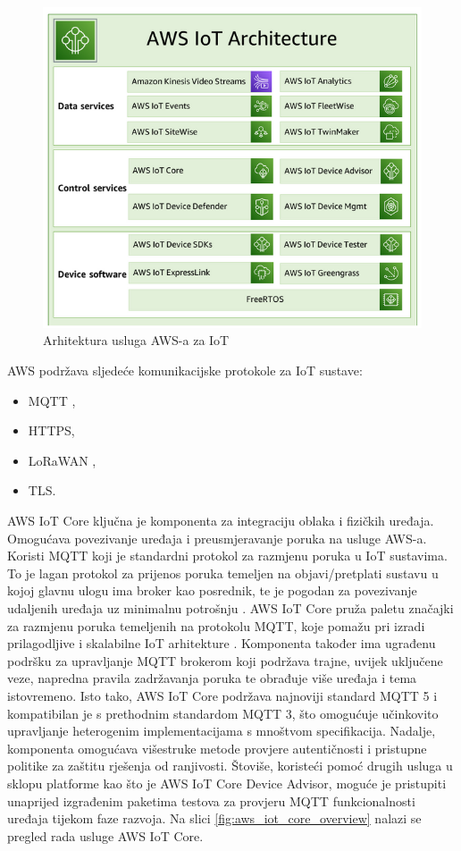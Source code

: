 \begin{figure}[ht]
	\centering
	\includegraphics[scale=0.8]{imgs/aws_iot_arch}
	\caption{Arhitektura usluga AWS-a za IoT \cite{aws_docs}}
	\label{fig:aws_iot_arch}
\end{figure}

AWS podržava sljedeće komunikacijske protokole za IoT sustave:
\begin{itemize}
	\item MQTT ,
	\item HTTPS,
	\item LoRaWAN ,
	\item TLS.
\end{itemize}

AWS IoT Core ključna je komponenta za integraciju oblaka i fizičkih uređaja. Omogućava povezivanje uređaja i preusmjeravanje poruka na usluge AWS-a. Koristi MQTT koji je standardni protokol za razmjenu poruka u IoT sustavima. To je lagan  protokol za prijenos poruka temeljen na objavi/pretplati sustavu u kojoj glavnu ulogu ima broker kao posrednik, te je pogodan za povezivanje udaljenih uređaja uz minimalnu potrošnju \cite{what_is_mqtt}. AWS IoT Core pruža paletu značajki za razmjenu poruka temeljenih na protokolu MQTT, koje pomažu pri izradi prilagodljive i skalabilne IoT arhitekture \cite{aws_docs}. Komponenta također ima ugrađenu podršku za upravljanje MQTT brokerom koji podržava trajne, uvijek uključene veze, napredna pravila zadržavanja poruka te obrađuje više uređaja i tema istovremeno. Isto tako, AWS IoT Core podržava najnoviji standard MQTT 5 i kompatibilan je s prethodnim standardom MQTT 3, što omogućuje učinkovito upravljanje heterogenim implementacijama s mnoštvom specifikacija. Nadalje, komponenta omogućava višestruke metode provjere autentičnosti i pristupne politike za zaštitu rješenja od ranjivosti. Štoviše, koristeći pomoć drugih usluga u sklopu platforme kao što je AWS IoT Core Device Advisor, moguće je pristupiti unaprijed izgrađenim paketima testova za provjeru MQTT funkcionalnosti uređaja tijekom faze razvoja. Na slici \ref{fig:aws_iot_core_overview} nalazi se pregled rada usluge AWS IoT Core.

